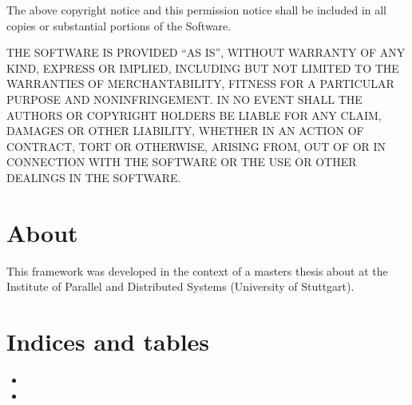 \documentclass[letterpaper,10pt,english]{sphinxmanual}
\begin{document}
\sphinxAtStartPar
The above copyright notice and this permission notice shall be included in all
copies or substantial portions of the Software.

\sphinxAtStartPar
THE SOFTWARE IS PROVIDED “AS IS”, WITHOUT WARRANTY OF ANY KIND, EXPRESS OR
IMPLIED, INCLUDING BUT NOT LIMITED TO THE WARRANTIES OF MERCHANTABILITY,
FITNESS FOR A PARTICULAR PURPOSE AND NONINFRINGEMENT. IN NO EVENT SHALL THE
AUTHORS OR COPYRIGHT HOLDERS BE LIABLE FOR ANY CLAIM, DAMAGES OR OTHER
LIABILITY, WHETHER IN AN ACTION OF CONTRACT, TORT OR OTHERWISE, ARISING FROM,
OUT OF OR IN CONNECTION WITH THE SOFTWARE OR THE USE OR OTHER DEALINGS IN THE
SOFTWARE.


\chapter{About}
\label{\detokenize{about:about}}\label{\detokenize{about::doc}}
\sphinxAtStartPar
This framework was developed in the context of a masters thesis about
at the Institute of Parallel and Distributed Systems (University of Stuttgart).


\chapter{Indices and tables}
\label{\detokenize{index:indices-and-tables}}\begin{itemize}
\item {} 
\sphinxAtStartPar
{}

\item {} 
\sphinxAtStartPar
{}

\end{itemize}
\end{document}
